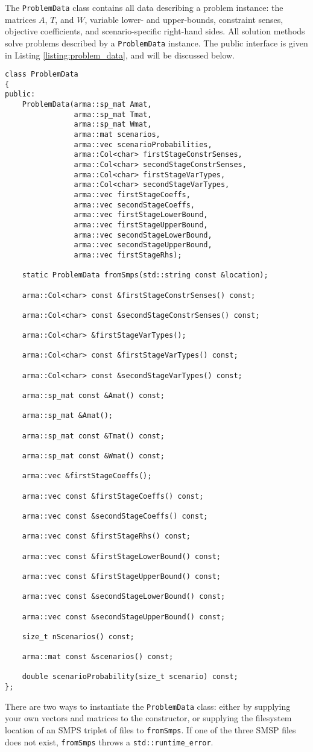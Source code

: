\documentclass[12pt, english]{article}
\begin{document}
The \texttt{ProblemData} class contains all data describing a problem instance: the matrices $A$, $T$, and $W$, variable lower- and upper-bounds, constraint senses, objective coefficients, and scenario-specific right-hand sides. All solution methods solve problems described by a \texttt{ProblemData} instance. The public interface is given in Listing \ref{listing:problem_data}, and will be discussed below.
\begin{lstlisting}[caption={Public interface of the \texttt{ProblemData} class.},
                   label={listing:problem_data}]
class ProblemData
{
public:
    ProblemData(arma::sp_mat Amat,
				arma::sp_mat Tmat,
				arma::sp_mat Wmat,
				arma::mat scenarios,
				arma::vec scenarioProbabilities,
				arma::Col<char> firstStageConstrSenses,
				arma::Col<char> secondStageConstrSenses,
				arma::Col<char> firstStageVarTypes,
				arma::Col<char> secondStageVarTypes,
				arma::vec firstStageCoeffs,
				arma::vec secondStageCoeffs,
				arma::vec firstStageLowerBound,
				arma::vec firstStageUpperBound,
				arma::vec secondStageLowerBound,
				arma::vec secondStageUpperBound,
				arma::vec firstStageRhs);

	static ProblemData fromSmps(std::string const &location);
	
	arma::Col<char> const &firstStageConstrSenses() const;
	
	arma::Col<char> const &secondStageConstrSenses() const;
	
	arma::Col<char> &firstStageVarTypes();
	
	arma::Col<char> const &firstStageVarTypes() const;
	
	arma::Col<char> const &secondStageVarTypes() const;
		
	arma::sp_mat const &Amat() const;
	
	arma::sp_mat &Amat();
	
	arma::sp_mat const &Tmat() const;
	
	arma::sp_mat const &Wmat() const;
	
	arma::vec &firstStageCoeffs();
	
	arma::vec const &firstStageCoeffs() const;
	
	arma::vec const &secondStageCoeffs() const;
	
	arma::vec const &firstStageRhs() const;
	
	arma::vec const &firstStageLowerBound() const;
	
	arma::vec const &firstStageUpperBound() const;
	
	arma::vec const &secondStageLowerBound() const;
	
	arma::vec const &secondStageUpperBound() const;
	
	size_t nScenarios() const;
	
	arma::mat const &scenarios() const;
	
	double scenarioProbability(size_t scenario) const;
};
\end{lstlisting}
There are two ways to instantiate the \texttt{ProblemData} class: either by supplying your own vectors and matrices to the constructor, or supplying the filesystem location of an SMPS triplet of files to \texttt{fromSmps}. If one of the three SMSP files does not exist, \texttt{fromSmps} throws a \texttt{std::runtime\_error}.
\end{document}
